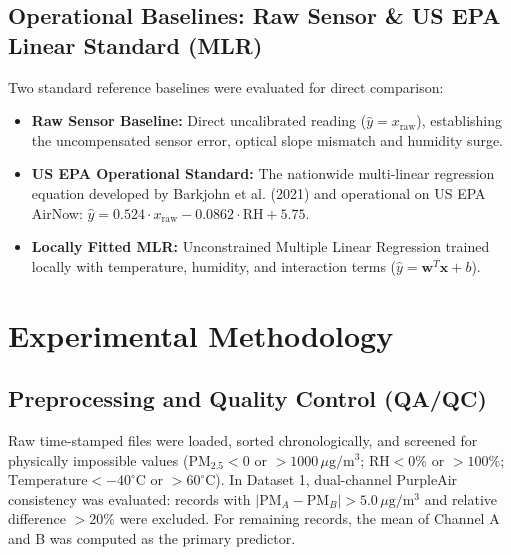 \documentclass[11pt,a4paper]{article}
\begin{document}
\subsection{Operational Baselines: Raw Sensor \& US EPA Linear Standard (MLR)}
Two standard reference baselines were evaluated for direct comparison:
\begin{itemize}
    \item \textbf{Raw Sensor Baseline:} Direct uncalibrated reading ($\hat{y} = x_{\text{raw}}$), establishing the uncompensated sensor error, optical slope mismatch and humidity surge.
    \item \textbf{US EPA Operational Standard:} The nationwide multi-linear regression equation developed by Barkjohn et al. (2021) and operational on US EPA AirNow: $\hat{y} = 0.524 \cdot x_{\text{raw}} - 0.0862 \cdot \text{RH} + 5.75$.
    \item \textbf{Locally Fitted MLR:} Unconstrained Multiple Linear Regression trained locally with temperature, humidity, and interaction terms ($\hat{y} = \mathbf{w}^T \mathbf{x} + b$).
\end{itemize}

\section{Experimental Methodology}

\subsection{Preprocessing and Quality Control (QA/QC)}
Raw time-stamped files were loaded, sorted chronologically, and screened for physically impossible values ($\text{PM}_{2.5} < 0$ or $> 1000\,\mu\text{g}/\text{m}^3$; $\text{RH} < 0\%$ or $> 100\%$; $\text{Temperature} < -40^\circ\text{C}$ or $> 60^\circ\text{C}$). In Dataset 1, dual-channel PurpleAir consistency was evaluated: records with $|\text{PM}_A - \text{PM}_B| > 5.0\,\mu\text{g}/\text{m}^3$ and relative difference $> 20\%$ were excluded. For remaining records, the mean of Channel A and B was computed as the primary predictor.
\end{document}
